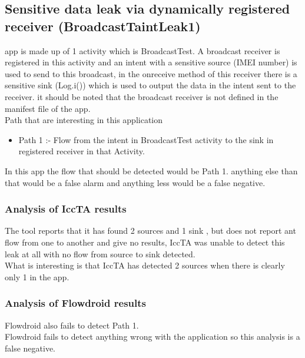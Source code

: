 \documentclass[journal]{IEEEtran}
\begin{document}
\subsection{Sensitive data leak via dynamically registered receiver (BroadcastTaintLeak1)}
% 
% 
% 
% 
 app is made up of 1 activity which is BroadcastTest. A broadcast receiver is registered in this activity and an intent with a sensitive source (IMEI number) is used to send to this broadcast, in the onreceive method of this receiver there is a sensitive sink (Log.i()) which is used to output the data in the intent sent to the receiver. it should be noted that the broadcast receiver is not defined in the manifest file of the app.\\
Path that are interesting in this application
\begin{itemize}
	\item Path 1 :-  Flow from the intent in BroadcastTest activity to the sink in registered receiver in that Activity.
\end{itemize}

In this app the flow that should be detected would be Path 1. anything else than that would be a false alarm and anything less would be a false negative. 

  

\subsubsection{Analysis of IccTA results}
The tool reports that it has found 2 sources and  1 sink , but does not report ant flow from one to another and give no results, IccTA was unable to detect this leak at all with no flow from source to sink detected.\\
What is interesting is that IccTA has detected 2 sources when there is clearly only 1 in the app.


\subsubsection{Analysis of Flowdroid results}
Flowdroid also fails to detect Path 1. \\
Flowdroid fails to detect anything wrong with the application so this analysis is a false negative.\\
\end{document}
